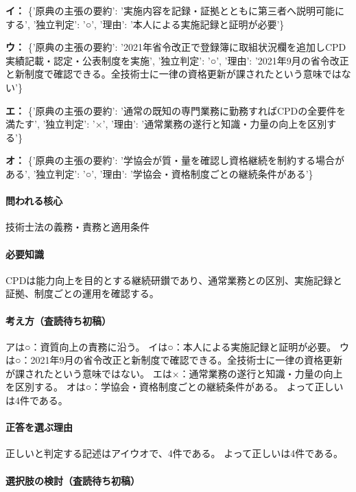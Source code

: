 \noindent\textbf{イ：} \{'原典の主張の要約': '実施内容を記録・証拠とともに第三者へ説明可能にする', '独立判定': '○', '理由': '本人による実施記録と証明が必要'\}\par

\noindent\textbf{ウ：} \{'原典の主張の要約': '2021年省令改正で登録簿に取組状況欄を追加しCPD実績記載・認定・公表制度を実施', '独立判定': '○', '理由': '2021年9月の省令改正と新制度で確認できる。全技術士に一律の資格更新が課されたという意味ではない'\}\par

\noindent\textbf{エ：} \{'原典の主張の要約': '通常の既知の専門業務に勤務すればCPDの全要件を満たす', '独立判定': '×', '理由': '通常業務の遂行と知識・力量の向上を区別する'\}\par

\noindent\textbf{オ：} \{'原典の主張の要約': '学協会が質・量を確認し資格継続を制約する場合がある', '独立判定': '○', '理由': '学協会・資格制度ごとの継続条件がある'\}\par

\paragraph{問われる核心} 技術士法の義務・責務と適用条件

\paragraph{必要知識} CPDは能力向上を目的とする継続研鑚であり、通常業務との区別、実施記録と証拠、制度ごとの運用を確認する。

\paragraph{考え方（査読待ち初稿）} アは○：資質向上の責務に沿う。 イは○：本人による実施記録と証明が必要。 ウは○：2021年9月の省令改正と新制度で確認できる。全技術士に一律の資格更新が課されたという意味ではない。 エは×：通常業務の遂行と知識・力量の向上を区別する。 オは○：学協会・資格制度ごとの継続条件がある。 よって正しいは4件である。

\paragraph{正答を選ぶ理由} 正しいと判定する記述はアイウオで、4件である。  よって正しいは4件である。

\paragraph{選択肢の検討（査読待ち初稿）}\mbox{}\par

